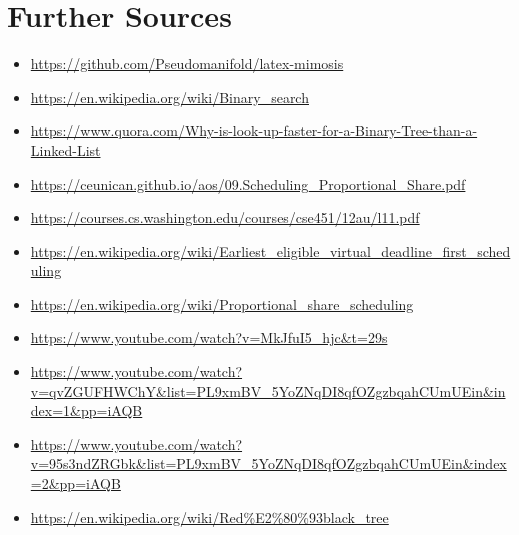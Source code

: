 \documentclass{mimosis}
\begin{document}
          \section*{Further Sources}
          \begin{itemize}
            \item \url{https://github.com/Pseudomanifold/latex-mimosis}
            \item \url{https://en.wikipedia.org/wiki/Binary_search}
            \item \url{https://www.quora.com/Why-is-look-up-faster-for-a-Binary-Tree-than-a-Linked-List}
            \item \url{https://ceunican.github.io/aos/09.Scheduling_Proportional_Share.pdf}
            \item \url{https://courses.cs.washington.edu/courses/cse451/12au/l11.pdf}
            \item \url{https://en.wikipedia.org/wiki/Earliest_eligible_virtual_deadline_first_scheduling}
            \item \url{https://en.wikipedia.org/wiki/Proportional_share_scheduling}
            \item \url{https://www.youtube.com/watch?v=MkJfuI5_hjc&t=29s}
            \item \url{https://www.youtube.com/watch?v=qvZGUFHWChY&list=PL9xmBV_5YoZNqDI8qfOZgzbqahCUmUEin&index=1&pp=iAQB}
            \item \url{https://www.youtube.com/watch?v=95s3ndZRGbk&list=PL9xmBV_5YoZNqDI8qfOZgzbqahCUmUEin&index=2&pp=iAQB}
            \item \url{https://en.wikipedia.org/wiki/Red%E2%80%93black_tree} 
          \end{itemize}

          
\end{document}
